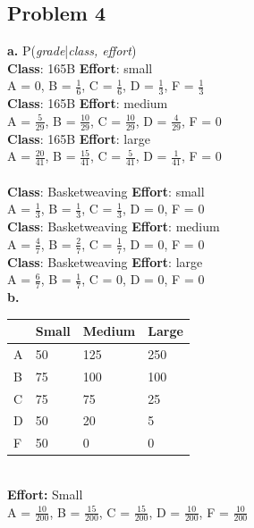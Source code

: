 \documentclass[letter]{article}
\theoremstyle{case}
\begin{document}
\subsection*{Problem 4}
\textbf{a. } P(\textit{grade}|\textit{class, effort}) \\
\textbf{Class}: 165B \textbf{Effort}: small \\
A = 0, B = $\frac{1}{6}$, C = $\frac{1}{6}$, D = $\frac{1}{3}$, F = $\frac{1}{3}$ \\
\textbf{Class}: 165B \textbf{Effort}: medium \\
A = $\frac{5}{29}$, B = $\frac{10}{29}$, C = $\frac{10}{29}$, D = $\frac{4}{29}$, F = 0 \\
\textbf{Class}: 165B \textbf{Effort}: large \\
A = $\frac{20}{41}$, B = $\frac{15}{41}$, C = $\frac{5}{41}$, D = $\frac{1}{41}$, F = 0 \\\\
\textbf{Class}: Basketweaving \textbf{Effort}: small \\
A = $\frac{1}{3}$, B = $\frac{1}{3}$, C = $\frac{1}{3}$, D = 0, F = 0 \\
\textbf{Class}: Basketweaving \textbf{Effort}: medium \\
A = $\frac{4}{7}$, B = $\frac{2}{7}$, C = $\frac{1}{7}$, D = 0, F = 0 \\
\textbf{Class}: Basketweaving \textbf{Effort}: large \\
A = $\frac{6}{7}$, B = $\frac{1}{7}$, C = 0, D = 0, F = 0 \\
\newpage
\textbf{b. } \\
\begin{table}[!h]
\begin{tabular}{|l|l|l|l|}
\hline
  & Small & Medium & Large \\ \hline
A & 50    & 125    & 250   \\ \hline
B & 75    & 100    & 100   \\ \hline
C & 75    & 75     & 25    \\ \hline
D & 50    & 20     & 5     \\ \hline
F & 50    & 0      & 0     \\ \hline
\end{tabular}
\end{table} \\
\textbf{Effort: } Small \\
A = $\frac{10}{200}$, B = $\frac{15}{200}$, C = $\frac{15}{200}$, D = $\frac{10}{200}$, F = $\frac{10}{200}$ \\
\end{document}
